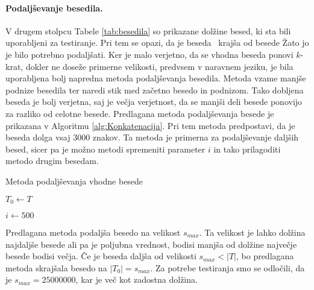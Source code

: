 \paragraph{Podaljševanje besedila.}

V drugem stolpcu Tabele \ref{tab:besedila} so prikazane dolžine besed, ki sta bili uporabljeni za testiranje. Pri tem se opazi, da je beseda \NK\ krajša od besede \DNK\. Zato jo je bilo potrebno podaljšati. Ker je malo verjetno, da se vhodna beseda ponovi $k$-krat, dokler ne doseže primerne velikosti, predvsem v naravnem jeziku, je bila uporabljena bolj napredna metoda podaljševanja besedila. Metoda vzame manjše podnize besedila ter naredi stik med začetno besedo in podnizom. Tako dobljena beseda je bolj verjetna, saj je večja verjetnost, da se manjši deli besede ponovijo za razliko od celotne besede. Predlagana metoda podaljševanja besede je prikazana v Algoritmu \ref{alg:Konkatenacija}. Pri tem metoda predpostavi, da je beseda dolga vsaj $3000$ znakov. Ta metoda je primerna za podaljševanje daljših besed, sicer pa je možno metodi spremeniti parameter $i$ in tako prilagoditi metodo drugim besedam.


\begin{algorithm}[htb]

\caption{Metoda podaljševanja vhodne besede}\label{alg:Konkatenacija}
{
    {$T_0\leftarrow T$}

    {$i\leftarrow 500$}
    
    
}
\end{algorithm}

Predlagana metoda podaljša besedo na velikost $s_{max}$. Ta velikost je lahko dolžina najdaljše besede ali pa je poljubna vrednost, bodisi manjša od dolžine največje besede bodisi večja. Če je beseda daljša od velikosti $s_{max}<|T|$, bo predlagana metoda skrajšala besedo na $|T_0|=s_{max}$. Za potrebe testiranja smo se odločili, da je $s_{max}=25000000$, kar je več kot zadostna dolžina.

